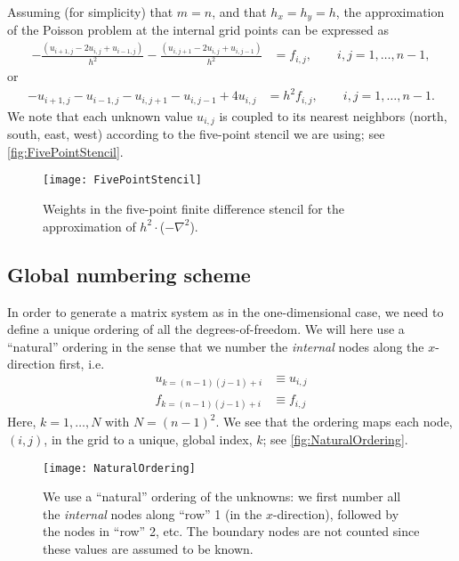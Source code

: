Assuming (for simplicity) that $m=n$, and that $h_x=h_y=h$, the approximation of
the Poisson problem at the internal grid points can be expressed as
\begin{align*}
  -\frac{(u_{i+1,j}-2u_{i,j}+u_{i-1,j})}{h^2}
  -\frac{(u_{i,j+1}-2u_{i,j}+u_{i,j-1})}{h^2}
  &= f_{i,j}, \qquad i,j=1,\ldots,n-1,
\end{align*}
or
\begin{align}
  -u_{i+1,j}-u_{i-1,j}-u_{i,j+1}-u_{i,j-1}+4u_{i,j} &= h^2 f_{i,j}, \qquad i,j=1,\ldots,n-1.
  \label{eq:Poisson2D_disc}
\end{align}
We note that each unknown value $u_{i,j}$ is coupled to its nearest neighbors
(north, south, east, west) according to the five-point stencil we are using; see
\autoref{fig:FivePointStencil}.

\begin{figure}
  \centering
  \texttt{[image: FivePointStencil]}
  \caption{
    Weights in the five-point finite difference stencil for the approximation of
    $h^2\cdot$($-\nabla^2$).
  }
  \label{fig:FivePointStencil}
\end{figure}

\subsection{Global numbering scheme}

In order to generate a matrix system as in the one-dimensional case, we need to
define a unique ordering of all the degrees-of-freedom. We will here use a
``natural'' ordering in the sense that we number the \emph{internal} nodes along
the $x$-direction first, i.e.
\begin{align*}
  u_{k=(n-1)(j-1)+i} & \equiv u_{i,j} \\
  f_{k=(n-1)(j-1)+i} &\equiv f_{i,j}
\end{align*}
Here, $k = 1,\ldots,N$ with $N=(n-1)^2$. We see that the ordering maps each
node, $(i,j)$, in the grid to a unique, global index, $k$; see
\autoref{fig:NaturalOrdering}.

\begin{figure}
  \centering
  \texttt{[image: NaturalOrdering]}
  \caption{
    We use a ``natural'' ordering of the unknowns: we first number all the
    \emph{internal} nodes along ``row'' 1 (in the $x$-direction), followed by
    the nodes in ``row'' 2, etc. The boundary nodes are not counted since these
    values are assumed to be known.
  }
  \label{fig:NaturalOrdering}
\end{figure}

